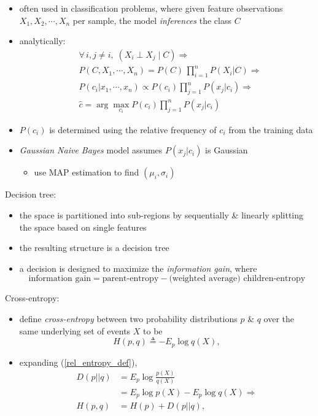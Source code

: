 \documentclass[onecolumn]{IEEEtran}
\newcommand{\beq}{\begin{equation}}
\newcommand{\eeq}{\end{equation}}
\newcommand{\bi}{\begin{itemize}}
\newcommand{\ei}{\end{itemize}}
\begin{document}
\begin{itemize}
        \item often used in classification problems, where given feature observations $X_1, X_2, \cdots, X_n$ per sample, the model \emph{inferences} the class $C$
        \item analytically:
        \beq\begin{split}
            & \forall \, i,j\neq i, \; (X_i \perp X_j \;|\; C) \Rightarrow\\
            &P(C,X_1,  \cdots, X_n) = P(C) \, \prod_{i=1}^n P(X_i|C)\Rightarrow\\
            &P(c_i | x_1,\cdots,x_n) \propto P(c_i) \prod_{j=1}^n P(x_j|c_i) \Rightarrow\\
            & \hat{c} = \arg\max_{c_i} P(c_i) \prod_{j=1}^n P(x_j|c_i)
        \end{split}\eeq
        \item $P(c_i)$ is determined using the relative frequency of $c_i$ from the training data
        \item \emph{Gaussian Naive Bayes} model assumes $ P(x_j|c_i)$ is Gaussian
        \bi
            \item use MAP estimation to find $(\mu_i,\sigma_i)$
        \ei
    \ei
    \item Decision tree:
    \bi
        \item the space is partitioned into sub-regions by sequentially \& linearly splitting the space based on single features
        \item the resulting structure is a decision tree
        \item a decision is designed to maximize the \emph{information gain}, where
        \beq
            \text{information gain} = \text{parent-entropy} - \text{(weighted average) } \text{children-entropy}
        \eeq
    \ei
    \item Cross-entropy:
    \bi
        \item define \emph{cross-entropy} between two probability distributions $p$ \& $q$ over the same underlying set of events $X$ to be
        \beq\label{cross_entropy_def}
            H(p,q) \triangleq  -E_p \log q(X),
        \eeq
        \item expanding (\ref{rel_entropy_def}),
        \beq\begin{split}
             D(p||q) &=  E_p \log \frac{p(X)}{q(X)}\\
             &= E_p \log p(X) - E_p \log q(X)\Rightarrow\\
            H(p,q)  &= H(p) + D(p||q),
        \end{split}\eeq

\end{itemize}
\end{document}
